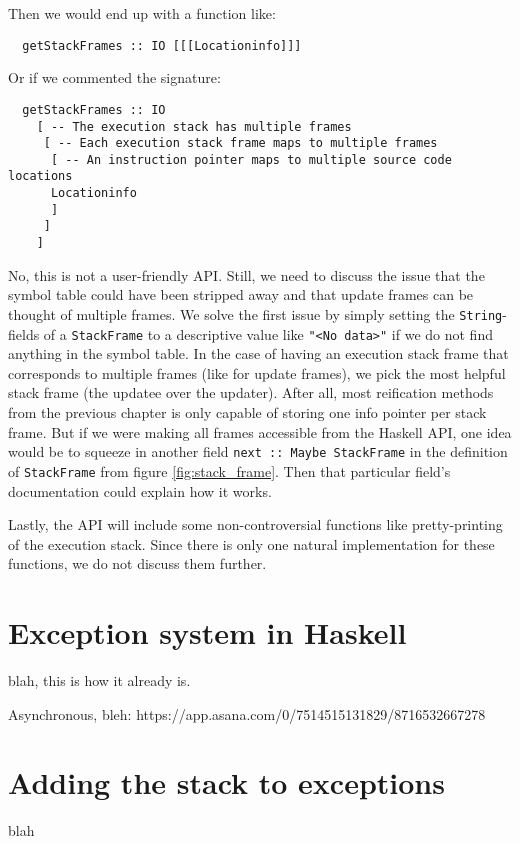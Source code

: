 Then we would end up with a function like:

\begin{verbatim}
  getStackFrames :: IO [[[Locationinfo]]]
\end{verbatim}

Or if we commented the signature:

\begin{verbatim}
  getStackFrames :: IO
    [ -- The execution stack has multiple frames
     [ -- Each execution stack frame maps to multiple frames
      [ -- An instruction pointer maps to multiple source code locations
      Locationinfo
      ]
     ]
    ]
\end{verbatim}

No, this is not a user-friendly API. Still, we need to discuss the issue
that the symbol table could have been stripped away and that update
frames can be thought of multiple frames. We solve the first issue by
simply setting the \texttt{String}-fields of a \texttt{StackFrame} to
a descriptive value like \texttt{"<No data>"} if we do not find anything
in the symbol table. In the case of having an
execution stack frame that corresponds to multiple
frames (like for update frames), we pick the most helpful stack frame
(the updatee over the updater).
After all, most reification methods from the previous chapter is only
capable of storing one info pointer per stack frame. But if we were
making all frames accessible from the Haskell API, one idea would be
to squeeze in another field \texttt{next :: Maybe StackFrame} in the
definition of \texttt{StackFrame} from figure \ref{fig:stack_frame}.
Then that particular field's documentation could explain how it works.

Lastly, the API will include some non-controversial functions like
pretty-printing of the execution stack.  Since there is only one natural
implementation for these functions, we do not discuss them further.

\section{Exception system in Haskell}

blah, this is how it already is.

Asynchronous, bleh: https://app.asana.com/0/7514515131829/8716532667278

\section{Adding the stack to exceptions}

blah
